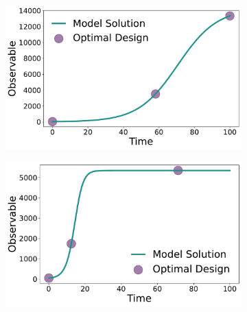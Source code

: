 \documentclass[graybox]{svmult}
\begin{document}
\begin{figure}[H]
    \begin{subfigure}{.5\textwidth}
        \centering
        \includegraphics[scale=0.255]{Figures/Observable_Results_baranyi_roberts_ode_fisher_determinant_2species_rel_sensit_cont_2times_2temps_000_x_00.pdf}
      \end{subfigure} 
    \begin{subfigure}{.5\textwidth}
        \centering
        \includegraphics[scale=0.255]{Figures/Observable_Results_baranyi_roberts_ode_fisher_determinant_2species_rel_sensit_cont_2times_2temps_001_x_00.pdf}
    \end{subfigure}
      \begin{subfigure}{.5\textwidth}
        \centering

\end{subfigure}
\end{figure}
\end{document}
